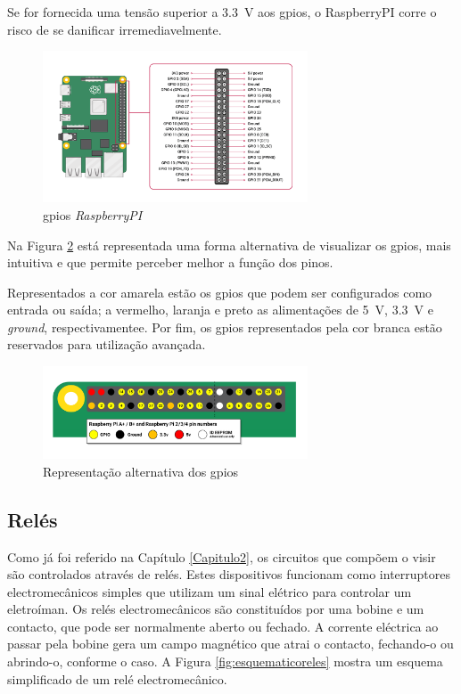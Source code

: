 Se for fornecida uma tensão superior a \SI{3.3}{\volt} aos \acrshort{gpio}s, o \gls{RaspberryPI} corre o risco de se danificar irremediavelmente.

\begin{figure}[hbtp]
    \centering
    \includegraphics[width=0.7\textwidth]{figures/GPIO-Pinout-Diagram-2.png}
    \caption{\acrshort{gpio}s \textit{RaspberryPI} \cite{Raspberrytech}}
    \label{fig:gpio}
\end{figure}

Na Figura \ref{fig:gpiocores} está representada uma forma alternativa de visualizar os \acrshort{gpio}s, mais intuitiva e que permite perceber melhor a função dos pinos.

Representados a cor amarela estão os \acrshort{gpio}s que podem ser configurados como entrada ou saída; a vermelho, laranja e preto as alimentações de \SI{5}{\volt}, \SI{3.3}{\volt} e \textit{ground}, respectivamentee. Por fim, os \acrshort{gpio}s representados pela cor branca estão reservados para utilização avançada.

\begin{figure}[hbtp]
    \centering
    \includegraphics[width=0.7\textwidth]{figures/GPIO.png}
    \caption{Representação alternativa dos \acrshort{gpio}s \cite{Raspberrytech}}
    \label{fig:gpiocores}
\end{figure}

\subsection{Relés}
\label{sec:reles}
Como já foi referido na Capítulo \ref{Capitulo2}, os circuitos que compõem o \acrshort{visir} são controlados através de relés. Estes dispositivos funcionam como interruptores electromecânicos simples que utilizam um sinal elétrico para controlar um eletroíman.
Os relés electromecânicos são constituídos por uma bobine e um contacto, que pode ser normalmente aberto ou fechado. A corrente eléctrica ao passar pela bobine gera um campo magnético que atrai o contacto, fechando-o ou abrindo-o, conforme o caso. A Figura \ref{fig:esquematicoreles} mostra um esquema simplificado de um relé electromecânico.


